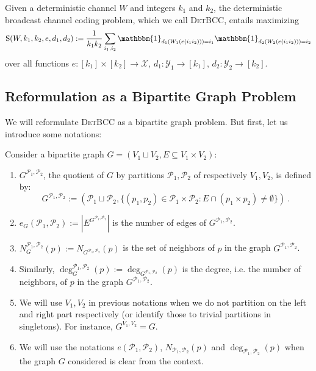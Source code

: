 \begin{definition}
  Given a deterministic channel $W$ and integers $k_1$ and $k_2$, the deterministic broadcast channel coding problem, which we call \textsc{DetBCC}, entails maximizing
  \[ \mathrm{S}(W,k_1,k_2,e,d_1,d_2) := \frac{1}{k_1k_2}\sum_{i_1,i_2}\mathbbm{1}_{d_1(W_1(e(i_1i_2)))=i_1}\mathbbm{1}_{d_2(W_2(e(i_1i_2)))=i_2}\]
  over all functions $e : [k_1] \times [k_2] \rightarrow \mathcal{X}$, $d_1 : \mathcal{Y}_1 \rightarrow [k_1]$,  $d_2 : \mathcal{Y}_2 \rightarrow [k_2]$.
\end{definition}

\subsection{Reformulation as a Bipartite Graph Problem}
We will reformulate \textsc{DetBCC} as a bipartite graph problem. But first, let us introduce some notations:

\begin{definition}
  Consider a bipartite graph $G = (V_1 \sqcup V_2, E \subseteq V_1 \times V_2)$:
  \begin{enumerate}
    \item $G^{\mathcal{P}_1,\mathcal{P}_2}$, the quotient of $G$ by partitions $\mathcal{P}_1,\mathcal{P}_2$ of respectively $V_1,V_2$, is defined by:
      \[ G^{\mathcal{P}_1,\mathcal{P}_2} := \left(\mathcal{P}_1 \sqcup \mathcal{P}_2, \{(p_1,p_2) \in \mathcal{P}_1 \times \mathcal{P}_2: E \cap (p_1 \times p_2) \not= \emptyset\}\right) \ .\]
    \item $e_G(\mathcal{P}_1,\mathcal{P}_2) := |E^{G^{\mathcal{P}_1,\mathcal{P}_2}}|$ is the number of edges of $G^{\mathcal{P}_1,\mathcal{P}_2}$.
    \item $N_G^{\mathcal{P}_1,\mathcal{P}_2}(p) := N_{G^{\mathcal{P}_1,\mathcal{P}_2}}(p)$ is the set of neighbors of $p$ in the graph $G^{\mathcal{P}_1,\mathcal{P}_2}$.
    \item Similarly, $\deg_G^{\mathcal{P}_1,\mathcal{P}_2}(p) := \deg_{G^{\mathcal{P}_1,\mathcal{P}_2}}(p)$ is the degree, i.e. the number of neighbors, of $p$ in the graph $G^{\mathcal{P}_1,\mathcal{P}_2}$.
    \item We will use $V_1,V_2$ in previous notations when we do not partition on the left and right part respectively (or identify those to trivial partitions in singletons). For instance, $G^{V_1,V_2}=G$.
    \item We will use the notations $e(\mathcal{P}_1,\mathcal{P}_2)$, $N_{\mathcal{P}_1,\mathcal{P}_2}(p)$  and $\deg_{\mathcal{P}_1,\mathcal{P}_2}(p)$ when the graph $G$ considered is clear from the context.
  \end{enumerate}
\end{definition}

